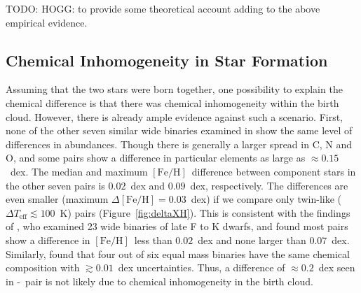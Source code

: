 \documentclass[modern, letterpaper]{aastex61}
\newcommand{\figname}{Figure}
\newcommand*\elem[1]{\ensuremath{\mathrm{#1}}}
\newcommand*\elemH[1]{\ensuremath{[\mathrm{#1}/\elem{H}]}}
\newcommand*{\feh}{\ensuremath{\elemH{Fe}}}
\newcommand{\sunanalog}{\text{Krios}}
\newcommand{\bizarreone}{\text{Kronos}}
\newcommand{\todo}[1]{{\color{blue}TODO: #1}}
\begin{document}
\todo{HOGG: to provide some theoretical account adding to the above empirical evidence.}

\subsection{Chemical Inhomogeneity in Star Formation}
\label{sub:chemical_inhomogeneity_in_star_formation}

Assuming that the two stars were born together, one possibility to
explain the chemical difference is that there was chemical inhomogeneity within
the birth cloud.
However, there is already ample evidence against such a scenario.
First, none of the other seven similar wide binaries examined in
\citealt{2016ApJS..225...32B} show the same level of differences in abundances.
Though there is generally a larger spread in $\elem{C}$, $\elem{N}$ and
$\elem{O}$, and some pairs show a difference in particular elements as large as
$\approx 0.15$~dex.
The median and maximum \feh\ difference between component stars in the other
seven pairs is $0.02$~dex and $0.09$~dex, respectively.
The differences are even smaller (maximum $\Delta\feh = 0.03$~dex) if we
compare only twin-like ($\Delta T_\mathrm{eff} \lesssim 100$~K) pairs
(\figname~\ref{fig:deltaXH}).
This is consistent with the findings of \citealt{Desidera:2004aa}, who examined
23 wide binaries of late F to K dwarfs, and found most pairs show a difference
in \feh\ less than $0.02$~dex and none larger than $0.07$~dex.
Similarly, \citealt{Gratton:2001aa} found that four out of six equal mass
binaries have the same chemical composition with $\gtrsim 0.01$~dex
uncertainties.
Thus, a difference of $\approx 0.2$~dex seen in \bizarreone-\sunanalog\ pair is
not likely due to chemical inhomogeneity in the birth cloud.
\end{document}
